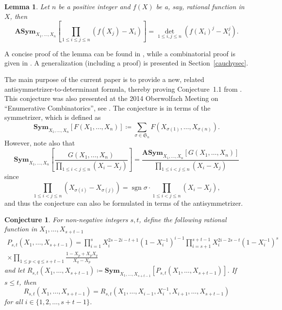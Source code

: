 \documentclass[12pt,dvipsnames]{amsart}
\newtheorem{lemma}[theorem]{Lemma}
\newtheorem{conj}[theorem]{Conjecture}
\theoremstyle{definition}
\DeclareMathOperator{\sgn}{sgn}
\newcommand{\asym}{\mathbf{ASym}}
\newcommand{\sym}{\mathbf{Sym}}
\begin{document}
\begin{lemma} 
\label{first}
Let $n$ be a positive integer and $f(X)$ be a, say, rational function in $X$, then 
$$
\asym_{X_1,\ldots,X_n} \left[ \prod_{1 \le i \le j \le n} (f(X_j)-X_i) \right] = \det_{1 \le i, j \le n} \left(f(X_i)^j-X_i^j\right).
$$
\end{lemma}

A concise proof of the lemma can be found in \cite[Lemma~3.2]{FisHo25}, while a combinatorial proof is given in \cite[Appendix~A]{FS24}. A generalization (including a proof) is presented in Section~\ref{cauchysec}.

The main purpose of the current paper is to provide a new, related antisymmetrizer-to-determinant formula, thereby proving Conjecture~1.1 from \cite{FisRie}. This conjecture was also presented at the 2014 Oberwolfach Meeting on ``Enumerative Combinatorics'', see \cite{OW14}.  The conjecture is in terms of the symmetrizer,  
which is defined as 
$$
\sym_{X_1,\ldots,X_n} \left[ F(X_1,\ldots,X_n) \right] \coloneq \sum_{\sigma \in \mathfrak{S}_n} F(X_{\sigma(1)},\ldots,X_{\sigma(n)}).
$$
However, note also that 
$$
\sym_{X_1,\ldots,X_n} \left[ \frac{G(X_1,\ldots,X_n)}{\prod_{1 \le i < j \le n} (X_i-X_j)} \right] = 
\frac{\asym_{X_1,\ldots,X_n} \left[ G(X_1,\ldots,X_n) \right]}{\prod_{1 \le i < j \le n} (X_i-X_j)}
$$
since 
$$
 \prod_{1 \le i < j \le n} (X_{\sigma(i)}-X_{\sigma(j)})=\sgn \sigma \cdot \prod_{1 \le i < j \le n} (X_i-X_j),
$$
and thus the conjecture can also be formulated in terms of the antisymmetrizer.

\begin{conj}{\cite[Conjecture 1.1]{FisRie}}
\label{mainconj} 
For non-negative integers $s,t$, define the following rational function in $X_1,\ldots,X_{s+t-1}$
\begin{multline*} 
P_{s,t}(X_1,\ldots,X_{s+t-1})=\prod_{i=1}^{s} X_i^{2s-2i-t+1} (1-X_i^{-1})^{i-1} \prod_{i=s+1}^{s+t-1} X_i^{2i-2s-t} (1-X_i^{-1})^s \\ \times
\prod_{1 \le p < q \le s+t-1} \frac{1-X_p+X_p X_q}{X_q-X_p}
\end{multline*} 
and let $R_{s,t}(X_1,\ldots,X_{s+t-1}) \coloneq \sym_{X_1,\ldots,X_{s+t-1}} \left[ P_{s,t}(X_1,\ldots,X_{s+t-1}) \right]$. If $s \le t$, then 
$$
R_{s,t}(X_1,\ldots,X_{s+t-1}) = R_{s,t}(X_1,\ldots,X_{i-1},X_i^{-1},X_{i+1},\ldots,X_{s+t-1})
$$ 
for all $i \in \{1,2,\ldots,s+t-1\}$. 
\end{conj}
\end{document}
